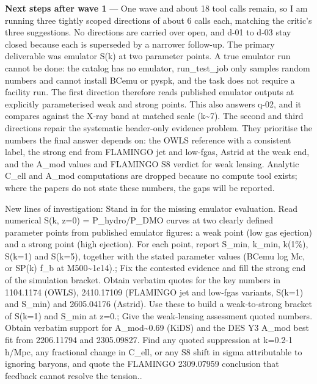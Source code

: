 \documentclass[11pt,a4paper]{article}
\begin{document}
\textbf{Next steps after wave 1} --- One wave and about 18 tool calls remain, so I am running three tightly scoped directions of about 6 calls each, matching the critic's three suggestions. No directions are carried over open, and d-01 to d-03 stay closed because each is superseded by a narrower follow-up. The primary deliverable was emulator S(k) at two parameter points. A true emulator run cannot be done: the catalog has no emulator, run\_test\_job only samples random numbers and cannot install BCemu or pyspk, and the task does not require a facility run. The first direction therefore reads published emulator outputs at explicitly parameterised weak and strong points. This also answers q-02, and it compares against the X-ray band at matched scale (k\textasciitilde{}7). The second and third directions repair the systematic header-only evidence problem. They prioritise the numbers the final answer depends on: the OWLS reference with a consistent label, the strong end from FLAMINGO jet and low-fgas, Astrid at the weak end, and the A\_mod values and FLAMINGO S8 verdict for weak lensing. Analytic C\_ell and A\_mod computations are dropped because no compute tool exists; where the papers do not state these numbers, the gaps will be reported.

New lines of investigation: Stand in for the missing emulator evaluation. Read numerical S(k, z=0) = P\_hydro/P\_DMO curves at two clearly defined parameter points from published emulator figures: a weak point (low gas ejection) and a strong point (high ejection). For each point, report S\_min, k\_min, k(1\%), S(k=1) and S(k=5), together with the stated parameter values (BCemu log Mc, or SP(k) f\_b at M500\textasciitilde{}1e14).; Fix the contested evidence and fill the strong end of the simulation bracket. Obtain verbatim quotes for the key numbers in 1104.1174 (OWLS), 2410.17109 (FLAMINGO jet and low-fgas variants, S(k=1) and S\_min) and 2605.04176 (Astrid). Use these to build a weak-to-strong bracket of S(k=1) and S\_min at z=0.; Give the weak-lensing assessment quoted numbers. Obtain verbatim support for A\_mod\textasciitilde{}0.69 (KiDS) and the DES Y3 A\_mod best fit from 2206.11794 and 2305.09827. Find any quoted suppression at k=0.2-1 h/Mpc, any fractional change in C\_ell, or any S8 shift in sigma attributable to ignoring baryons, and quote the FLAMINGO 2309.07959 conclusion that feedback cannot resolve the tension..
\end{document}

